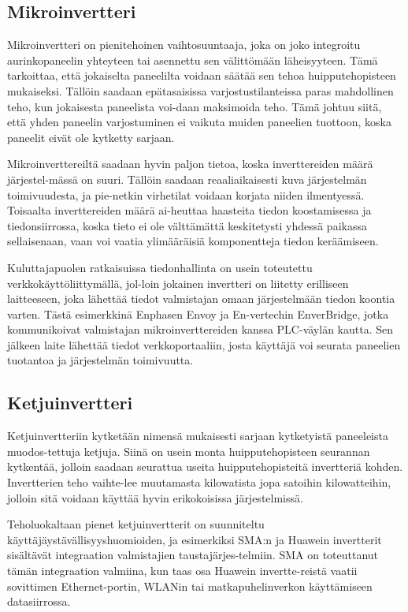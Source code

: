 \subsection{Mikroinvertteri}
  Mikroinvertteri on pienitehoinen vaihtosuuntaaja, joka on joko integroitu aurinkopaneelin yhteyteen tai asennettu sen välittömään läheisyyteen. Tämä tarkoittaa, että jokaiselta paneelilta voidaan säätää sen tehoa huipputehopisteen mukaiseksi. Tällöin saadaan epätasaisissa varjostustilanteissa paras mahdollinen teho, kun jokaisesta paneelista voi-daan maksimoida teho. Tämä johtuu siitä, että yhden paneelin varjostuminen ei vaikuta muiden paneelien tuottoon, koska paneelit eivät ole kytketty sarjaan.

  Mikroinverttereiltä saadaan hyvin paljon tietoa, koska inverttereiden määrä järjestel-mässä on suuri. Tällöin saadaan reaaliaikaisesti kuva järjestelmän toimivuudesta, ja pie-netkin virhetilat voidaan korjata niiden ilmentyessä. Toisaalta inverttereiden määrä ai-heuttaa haasteita tiedon koostamisessa ja tiedonsiirrossa, koska tieto ei ole välttämättä keskitetysti yhdessä paikassa sellaisenaan, vaan voi vaatia ylimääräisiä komponentteja tiedon keräämiseen.

  Kuluttajapuolen ratkaisuissa tiedonhallinta on usein toteutettu verkkokäyttöliittymällä, jol-loin jokainen invertteri on liitetty erilliseen laitteeseen, joka lähettää tiedot valmistajan omaan järjestelmään tiedon koontia varten. Tästä esimerkkinä Enphasen Envoy ja En-vertechin EnverBridge, jotka kommunikoivat valmistajan mikroinverttereiden kanssa PLC-väylän kautta. Sen jälkeen laite lähettää tiedot verkkoportaaliin, josta käyttäjä voi seurata paneelien tuotantoa ja järjestelmän toimivuutta.

\subsection{Ketjuinvertteri}
  Ketjuinvertteriin kytketään nimensä mukaisesti sarjaan kytketyistä paneeleista muodos-tettuja ketjuja. Siinä on usein monta huipputehopisteen seurannan kytkentää, jolloin saadaan seurattua useita huipputehopisteitä invertteriä kohden. Invertterien teho vaihte-lee muutamasta kilowatista jopa satoihin kilowatteihin, jolloin sitä voidaan käyttää hyvin erikokoisissa järjestelmissä.

  Teholuokaltaan pienet ketjuinvertterit on suunniteltu käyttäjäystävällisyyshuomioiden, ja esimerkiksi SMA:n ja Huawein invertterit sisältävät integraation valmistajien taustajärjes-telmiin. SMA on toteuttanut tämän integraation valmiina, kun taas osa Huawein invertte-reistä vaatii sovittimen Ethernet-portin, WLANin tai matkapuhelinverkon käyttämiseen datasiirrossa.

